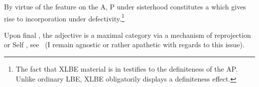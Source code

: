 \documentclass[output=paper]{langsci/langscibook}
\begin{document}
By virtue of the \Def{} feature on the A, P under sisterhood
constitutes a  which gives rise to incorporation under
defectivity.\footnote{The fact that XLBE material is in  testifies
    to the definiteness of the AP. Unlike ordinary \gls{LBE}, XLBE obligatorily displays a definiteness effect.}

\begin{exe}
	\ex

	\hfill\null
	\label{der3}
\end{exe}

Upon final , the adjective is a maximal category via a mechanism
of reprojection or Self , see~ (I remain agnostic or
rather apathetic with regards to this issue).
\end{document}
